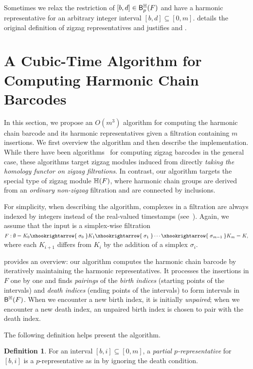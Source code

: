 \documentclass[10pt,a4paper]{amsart}
\newcommand {\mm}[1] {\ifmmode{#1}\else{\mbox{\(#1\)}}\fi}
\newcommand{\har}           {\mm{\mathbb{H}}}
\newcommand{\hcb}{{harmonic chain barcode}}
\theoremstyle{definition}
\newcommand{\filt}{F}
\newcommand{\filtcnt}{m}
\newcommand{\fsimp}{\sigma}
\newcommand{\lbarrowspace}{\;}
\newcommand{\inctosp}[1]{\xhookrightarrow{\lbarrowspace#1\lbarrowspace}}
\newcommand{\hbarc}{\mathsf{B}^\har}
\newtheorem{definition}[theorem]{Definition}
\theoremstyle{remark}
\begin{document}
Sometimes we relax the restriction of $[b,d]\in\hbarc_p(\filt)$ 
and have a harmonic representative for an arbitrary integer interval $[b,d]\subseteq[0,\filtcnt]$.
 details the original definition of zigzag representatives
and justifies  and . 
\section{A Cubic-Time Algorithm for Computing Harmonic Chain Barcodes}\label{sec:algorithm}
In this section, we propose an $O(\filtcnt^3)$ algorithm for computing the {\hcb}  and its harmonic representatives given a filtration containing $\filtcnt$ insertions.
We first overview the algorithm and then describe the implementation.
While there have been algorithms~\cite{CarlssonSilvaMorozov2009,zzrep,maria2015zigzag} for computing zigzag barcodes in the general case, these algorithms target zigzag modules induced from directly \emph{taking the homology functor on zigzag filtrations}.
In contrast, our algorithm targets the special type of zigzag module $\har(\filt)$, where harmonic chain groups are derived from an \emph{ordinary non-zigzag} filtration and
are connected by inclusions.

For simplicity, when describing the algorithm, complexes in a filtration are always 
indexed by integers instead of the real-valued timestamps (see~).
Again, we assume that the input is a simplex-wise filtration 
$\filt: 
\emptyset
=K_0 \inctosp{\fsimp_0} K_1 \inctosp{\fsimp_1} 
\cdots \inctosp{\fsimp_{\filtcnt-1}} K_\filtcnt=K,
$
where each $K_{i+1}$ differs from $K_i$ by the addition of a simplex $\fsimp_i$. 

 provides an overview: our algorithm computes the harmonic chain barcode by iteratively maintaining the harmonic representatives. 
It processes the insertions in $\filt$ one by one and finds \emph{pairings} of the \emph{birth indices} (starting points of the intervals) and \emph{death indices} (ending points of the intervals) to form intervals in $\hbarc(\filt)$. 
When we encounter a new birth index, it is initially \emph{unpaired};
when we encounter a new death index, an unpaired birth index is chosen to pair with the death index. 

The following definition helps present the algorithm.
\begin{definition}
For an interval $[b,i] \subseteq [0,\filtcnt]$,
a \emph{partial $p$-representative} for $[b,i]$ is a $p$-representative as in 
by ignoring the death condition.
\end{definition}
\end{document}
